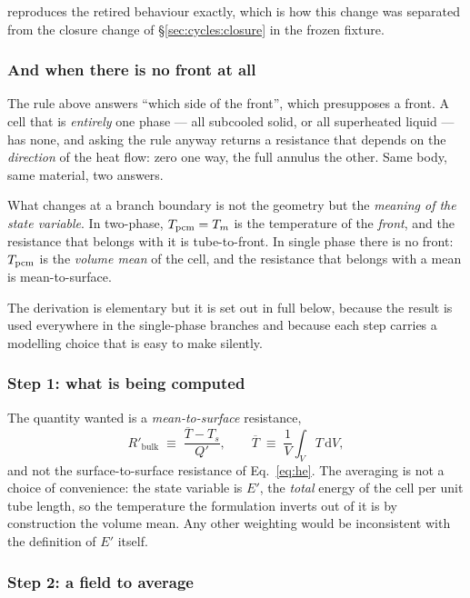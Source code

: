 reproduces the retired behaviour
exactly, which is how this change was separated from the closure change of
\S\ref{sec:cycles:closure} in the frozen fixture.

\subsubsection*{And when there is no front at all}

The rule above answers ``which side of the front'', which presupposes a front. A
cell that is \emph{entirely} one phase --- all subcooled solid, or all
superheated liquid --- has none, and asking the rule anyway returns a resistance
that depends on the \emph{direction} of the heat flow: zero one way, the full
annulus the other. Same body, same material, two answers.

What changes at a branch boundary is not the geometry but the \emph{meaning of
the state variable}. In two-phase, $T_{\mathrm{pcm}}=T_{m}$ is the temperature of the
\emph{front}, and the resistance that belongs with it is tube-to-front. In
single phase there is no front: $T_{\mathrm{pcm}}$ is the \emph{volume mean} of the cell,
and the resistance that belongs with a mean is mean-to-surface.

The derivation is elementary but it is set out in full below, because the
result is used everywhere in the single-phase branches and because each step
carries a modelling choice that is easy to make silently.

\subsubsection*{Step 1: what is being computed}

The quantity wanted is a \emph{mean-to-surface} resistance,
\begin{equation}
  R'_{\mathrm{bulk}} \;\equiv\; \frac{\overline{T}-T_{s}}{Q'},
  \qquad
  \overline{T} \;\equiv\; \frac{1}{V}\int_{V} T\,\mathrm{d}V,
  \label{eq:bulk-def}
\end{equation}
and not the surface-to-surface resistance of Eq.~\eqref{eq:he}. The averaging
is not a choice of convenience: the state variable is $E'$, the \emph{total}
energy of the cell per unit tube length, so the temperature the formulation
inverts out of it is by construction the volume mean. Any other weighting would
be inconsistent with the definition of $E'$ itself.

\subsubsection*{Step 2: a field to average}

